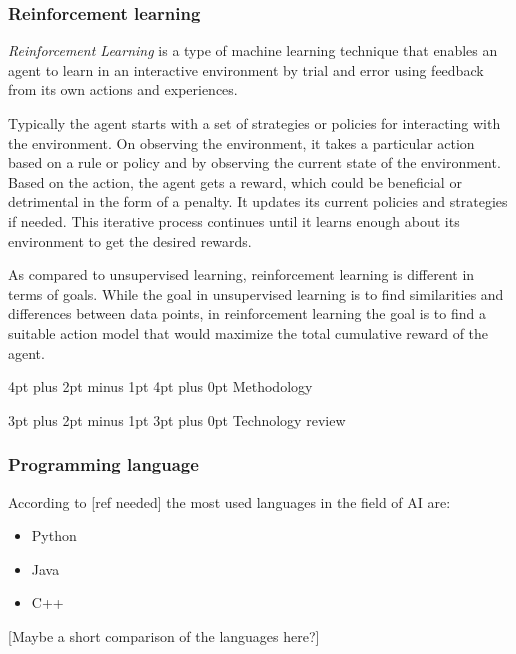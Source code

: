 \documentclass[12pt,a4paper]{article}
\makeatletter
\renewcommand\subsection{\@startsection {subsection}{1}{2mm} %
                                        {3pt plus 2pt minus 1pt} %
                                        {3pt plus 0pt} %
                                        {\normalfont\bfseries}}
\renewcommand\section{\@startsection {section}{1}{0mm} %
                                     {4pt plus 2pt minus 1pt} %
                                     {4pt plus 0pt} %
                                     {\bfseries}}
\makeatother
\begin{document}
\subsubsection{Reinforcement learning}
\textit{Reinforcement Learning} is a type of machine learning technique that enables an agent to learn in an interactive environment by trial and error using feedback from its own actions and experiences. 

Typically the agent starts with a set of strategies or policies for interacting with the environment. On observing the environment, it takes a particular action based on a rule or policy and by observing the current state of the environment. Based on the action, the agent gets a reward, which could be beneficial or detrimental in the form of a penalty. It updates its current policies and strategies if needed. This iterative process continues until it learns enough about its environment to get the desired rewards. 

As compared to unsupervised learning, reinforcement learning is different in terms of goals. While the goal in unsupervised learning is to find similarities and differences between data points, in reinforcement learning the goal is to find a suitable action model that would maximize the total cumulative reward of the agent. 

\newpage
\section{Methodology}

\subsection{Technology review}
\subsubsection{Programming language}
According to [ref needed] the most used languages in the field of AI are:
\begin{itemize}
    \item Python
    \item Java
    \item C++    
\end{itemize}

[Maybe a short comparison of the languages here?]
\end{document}
